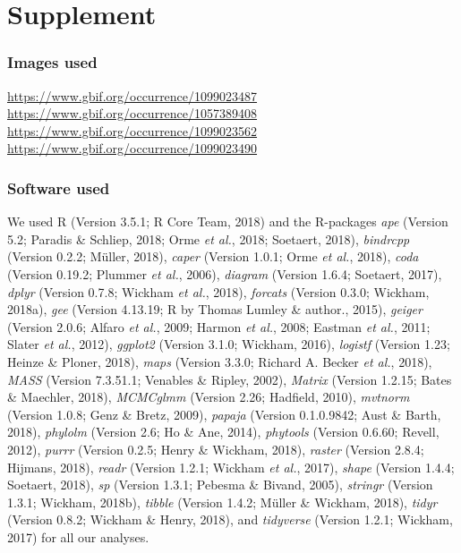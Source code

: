 \documentclass[man,floatsintext]{apa6}
\theoremstyle{definition}
\theoremstyle{definition}
\theoremstyle{definition}
\theoremstyle{remark}
\begin{document}
\endgroup

\newpage
\setcounter{table}{0}  \renewcommand{\thetable}{S\arabic{table}} \setcounter{figure}{0} \renewcommand{\thefigure}{S\arabic{figure}}

\hypertarget{supplement}{%
\section{Supplement}\label{supplement}}

\hypertarget{images-used}{%
\subsubsection{Images used}\label{images-used}}

\url{https://www.gbif.org/occurrence/1099023487}
\url{https://www.gbif.org/occurrence/1057389408}
\url{https://www.gbif.org/occurrence/1099023562}
\url{https://www.gbif.org/occurrence/1099023490}

\hypertarget{software-used}{%
\subsubsection{Software used}\label{software-used}}

We used R (Version 3.5.1; R Core Team, 2018) and the R-packages
\emph{ape} (Version 5.2; Paradis \& Schliep, 2018; Orme \emph{et al.},
2018; Soetaert, 2018), \emph{bindrcpp} (Version 0.2.2; Müller, 2018),
\emph{caper} (Version 1.0.1; Orme \emph{et al.}, 2018), \emph{coda}
(Version 0.19.2; Plummer \emph{et al.}, 2006), \emph{diagram} (Version
1.6.4; Soetaert, 2017), \emph{dplyr} (Version 0.7.8; Wickham \emph{et
al.}, 2018), \emph{forcats} (Version 0.3.0; Wickham, 2018a), \emph{gee}
(Version 4.13.19; R by Thomas Lumley \& author., 2015), \emph{geiger}
(Version 2.0.6; Alfaro \emph{et al.}, 2009; Harmon \emph{et al.}, 2008;
Eastman \emph{et al.}, 2011; Slater \emph{et al.}, 2012), \emph{ggplot2}
(Version 3.1.0; Wickham, 2016), \emph{logistf} (Version 1.23; Heinze \&
Ploner, 2018), \emph{maps} (Version 3.3.0; Richard A. Becker \emph{et
al.}, 2018), \emph{MASS} (Version 7.3.51.1; Venables \& Ripley, 2002),
\emph{Matrix} (Version 1.2.15; Bates \& Maechler, 2018), \emph{MCMCglmm}
(Version 2.26; Hadfield, 2010), \emph{mvtnorm} (Version 1.0.8; Genz \&
Bretz, 2009), \emph{papaja} (Version 0.1.0.9842; Aust \& Barth, 2018),
\emph{phylolm} (Version 2.6; Ho \& Ane, 2014), \emph{phytools} (Version
0.6.60; Revell, 2012), \emph{purrr} (Version 0.2.5; Henry \& Wickham,
2018), \emph{raster} (Version 2.8.4; Hijmans, 2018), \emph{readr}
(Version 1.2.1; Wickham \emph{et al.}, 2017), \emph{shape} (Version
1.4.4; Soetaert, 2018), \emph{sp} (Version 1.3.1; Pebesma \& Bivand,
2005), \emph{stringr} (Version 1.3.1; Wickham, 2018b), \emph{tibble}
(Version 1.4.2; Müller \& Wickham, 2018), \emph{tidyr} (Version 0.8.2;
Wickham \& Henry, 2018), and \emph{tidyverse} (Version 1.2.1; Wickham,
2017) for all our analyses. \newpage
\end{document}
